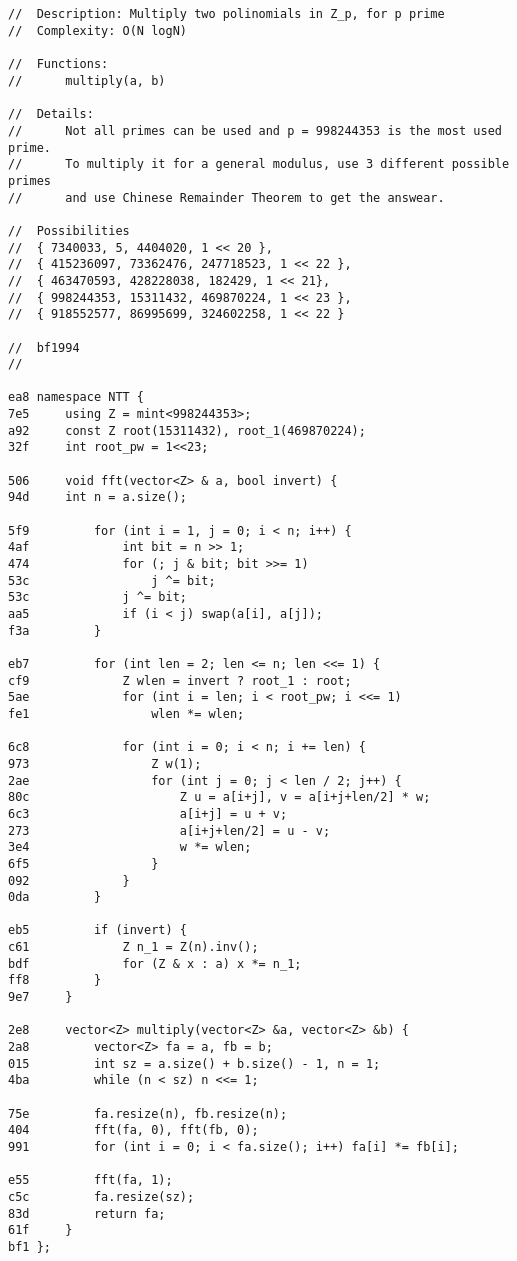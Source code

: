 \documentclass[11pt, a4paper, twoside]{article}
\begin{document}
\subsection{}
\begin{lstlisting}
//  Description: Multiply two polinomials in Z_p, for p prime
//  Complexity: O(N logN)

//  Functions:
//      multiply(a, b)

//  Details:
//      Not all primes can be used and p = 998244353 is the most used prime. 
//      To multiply it for a general modulus, use 3 different possible primes 
//      and use Chinese Remainder Theorem to get the answear.

//  Possibilities
//  { 7340033, 5, 4404020, 1 << 20 },
//  { 415236097, 73362476, 247718523, 1 << 22 },
//  { 463470593, 428228038, 182429, 1 << 21},
//  { 998244353, 15311432, 469870224, 1 << 23 },
//  { 918552577, 86995699, 324602258, 1 << 22 }

//  bf1994
//

ea8 namespace NTT {
7e5     using Z = mint<998244353>;
a92     const Z root(15311432), root_1(469870224);
32f     int root_pw = 1<<23;
    
506     void fft(vector<Z> & a, bool invert) {
94d 	int n = a.size();
    
5f9         for (int i = 1, j = 0; i < n; i++) {
4af             int bit = n >> 1;
474             for (; j & bit; bit >>= 1)
53c                 j ^= bit;
53c             j ^= bit;
aa5             if (i < j) swap(a[i], a[j]);
f3a         }
    
eb7         for (int len = 2; len <= n; len <<= 1) {
cf9             Z wlen = invert ? root_1 : root;
5ae             for (int i = len; i < root_pw; i <<= 1)
fe1                 wlen *= wlen;
    
6c8             for (int i = 0; i < n; i += len) {
973                 Z w(1);
2ae                 for (int j = 0; j < len / 2; j++) {
80c                     Z u = a[i+j], v = a[i+j+len/2] * w;
6c3                     a[i+j] = u + v;
273                     a[i+j+len/2] = u - v;
3e4                     w *= wlen;
6f5                 }
092             }
0da         }
    
eb5         if (invert) {
c61             Z n_1 = Z(n).inv();
bdf             for (Z & x : a) x *= n_1;
ff8         }
9e7     }
     
2e8     vector<Z> multiply(vector<Z> &a, vector<Z> &b) {
2a8         vector<Z> fa = a, fb = b;
015         int sz = a.size() + b.size() - 1, n = 1;
4ba         while (n < sz) n <<= 1;
    
75e         fa.resize(n), fb.resize(n);
404         fft(fa, 0), fft(fb, 0);
991         for (int i = 0; i < fa.size(); i++) fa[i] *= fb[i];
    
e55         fft(fa, 1);
c5c         fa.resize(sz);
83d         return fa;
61f     }
bf1 };
\end{lstlisting}
\end{document}
